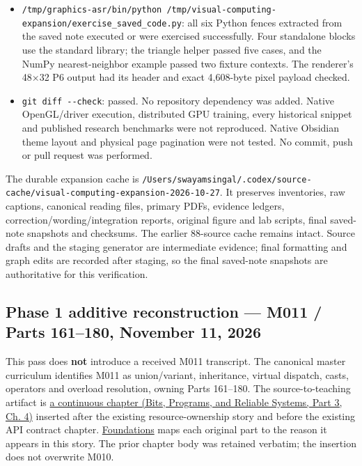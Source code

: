 \begin{itemize}
\item
  \texttt{/tmp/graphics-asr/bin/python\ /tmp/visual-computing-expansion/exercise\_saved\_code.py}: all six Python fences extracted from the saved note executed or were exercised successfully. Four standalone blocks use the standard library; the triangle helper passed five cases, and the NumPy nearest-neighbor example passed two fixture contexts. The renderer's 48×32 P6 output had its header and exact 4,608-byte pixel payload checked.
\item
  \texttt{git\ diff\ -\/-check}: passed. No repository dependency was added. Native OpenGL/driver execution, distributed GPU training, every historical snippet and published research benchmarks were not reproduced. Native Obsidian theme layout and physical page pagination were not tested. No commit, push or pull request was performed.
\end{itemize}

The durable expansion cache is \texttt{/Users/swayamsingal/.codex/source-cache/visual-computing-expansion-2026-10-27}. It preserves inventories, raw captions, canonical reading files, primary PDFs, evidence ledgers, correction/wording/integration reports, original figure and lab scripts, final saved-note snapshots and checksums. The earlier 88-source cache remains intact. Source drafts and the staging generator are intermediate evidence; final formatting and graph edits are recorded after staging, so the final saved-note snapshots are authoritative for this verification.

\subsection{Phase 1 additive reconstruction --- M011 / Parts 161--180, November 11, 2026}\label{appendix-a103e7846d21-phase-1-additive-reconstruction-m011-parts-161180-november-11-2026}

\hypertarget{appendix-a103e7846d21-phase-1-additive-reconstruction-m011-parts-161180-november-11-2026}{}

This pass does \textbf{not} introduce a received M011 transcript. The canonical master curriculum identifies M011 as union/variant, inheritance, virtual dispatch, casts, operators and overload resolution, owning Parts 161--180. The source-to-teaching artifact is \href{../01-Bits-Programs-and-Reliable-Systems-P03/main.pdf\#nameddest=01-foundations-i-ch004-from-one-owned-resource-to-many-requests-and-a-replaceable-backend}{a continuous chapter (Bits, Programs, and Reliable Systems, Part 3, Ch. 4)} inserted after the existing resource-ownership story and before the existing API contract chapter. \hyperref[appendix-fd090d982a15-m011-parts-161180-a-request-changes-shape-and-a-backend-changes-implementation]{Foundations} maps each original part to the reason it appears in this story. The prior chapter body was retained verbatim; the insertion does not overwrite M010.

